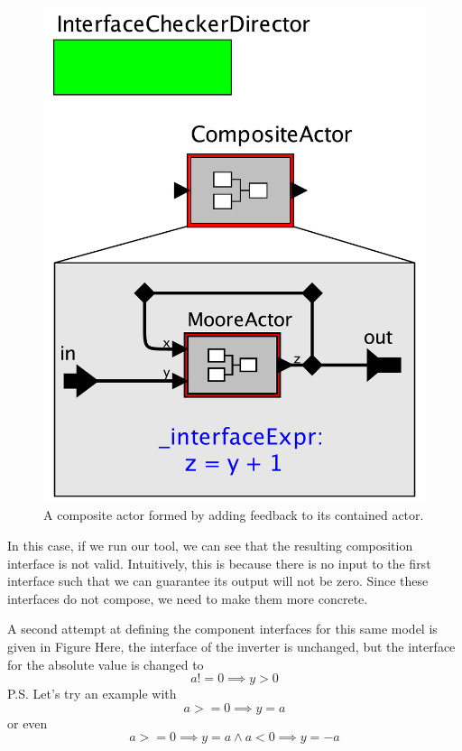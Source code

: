 \documentclass[preprint,11pt,authoryear]{sigplanconf}
\begin{document}
\begin{figure}[htbp]
\centering
\includegraphics[width=\columnwidth]{figs/feedbackComp} 
\caption{A composite actor formed by adding feedback to its contained actor.}
\label{fig:feedbackComp}
\end{figure}

In this case, if we run our tool, we can see that the resulting composition interface is not valid.  Intuitively, this is because there is no input to the first interface such that we can guarantee its output will not be zero.  Since these interfaces do not compose, we need to make them more concrete.

A second attempt at defining the component interfaces for this same model is given in Figure%
Here, the interface of the inverter is unchanged, but the interface for the absolute value is changed to
\[
a != 0 \implies y > 0
\]
P.S. Let's try an example with \[ a >= 0 \implies y = a\] or even \[a >= 0 \implies y = a  \wedge a < 0 \implies y = -a\]
\end{document}
